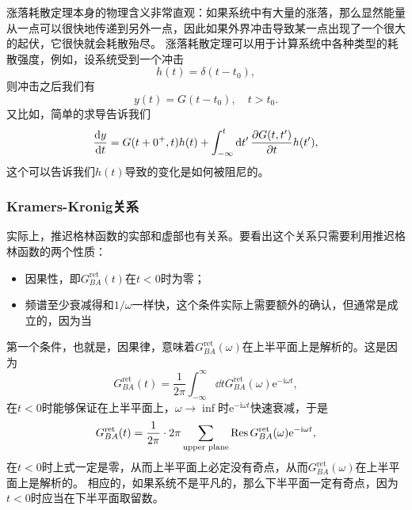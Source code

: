 \documentclass[hyperref, UTF8, a4paper]{ctexart}
\newcommand*{\ii}{\mathrm{i}}
\newcommand*{\ee}{\mathrm{e}}
\begin{document}
涨落耗散定理本身的物理含义非常直观：如果系统中有大量的涨落，那么显然能量从一点可以很快地传递到另外一点，因此如果外界冲击导致某一点出现了一个很大的起伏，它很快就会耗散殆尽。
涨落耗散定理可以用于计算系统中各种类型的耗散强度，例如，设系统受到一个冲击
\[
    h(t) = \delta(t-t_0),
\]
则冲击之后我们有
\[
    y(t) = G(t-t_0), \quad t > t_0.
\]
又比如，简单的求导告诉我们
\begin{equation}
    \dv{y}{t} = G(t+0^+, t) h(t) + \int_{-\infty}^t \dd{t'} \pdv{G(t, t')}{t} h(t'),
\end{equation}
这个可以告诉我们$h(t)$导致的变化是如何被阻尼的。

\subsubsection{Kramers-Kronig关系}

实际上，推迟格林函数的实部和虚部也有关系。要看出这个关系只需要利用推迟格林函数的两个性质：
\begin{itemize}
    \item 因果性，即$G_{BA}^\text{ret}(t)$在$t<0$时为零；
    \item 频谱至少衰减得和$1/\omega$一样快，这个条件实际上需要额外的确认，但通常是成立的，因为当
\end{itemize}

第一个条件，也就是，因果律，意味着$G_{BA}^\text{ret}(\omega)$在上半平面上是解析的。这是因为
\[
    G_{BA}^\text{ret}(t) = \frac{1}{2\pi} \int_{-\infty}^\infty \dd{t} G_{BA}^\text{ret}(\omega) \ee^{-\ii\omega t},
\]
在$t<0$时能够保证在上半平面上，$\omega\to\inf$时$\ee^{-\ii \omega t}$快速衰减，于是
\[
    G_{BA}^\text{ret}(t) = \frac{1}{2\pi} \cdot 2 \pi \sum_\text{upper plane}  \Res G_{BA}^\text{ret}(\omega) \ee^{-\ii\omega t},
\]
在$t<0$时上式一定是零，从而上半平面上必定没有奇点，从而$G_{BA}^\text{ret}(\omega)$在上半平面上是解析的。
相应的，如果系统不是平凡的，那么下半平面一定有奇点，因为$t<0$时应当在下半平面取留数。
\end{document}
